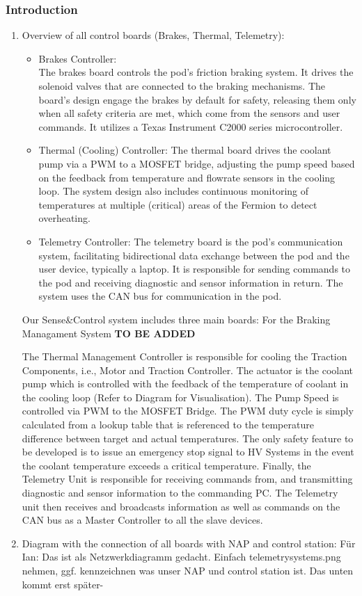 \subsubsection{Introduction}
\begin{enumerate}
    \item Overview of all control boards (Brakes, Thermal, Telemetry):
    \begin{itemize}
        \item Brakes Controller: \\
        The brakes board controls the pod's friction braking system.
        It drives the solenoid valves that are connected to the braking mechanisms.
        The board's design engage the brakes by default for safety, releasing them only when all safety criteria are met,
        which come from the sensors and user commands. 
        It utilizes a Texas Instrument C2000 series microcontroller.
        \item Thermal (Cooling) Controller: The thermal board drives the coolant pump via a PWM to a MOSFET bridge, adjusting the pump speed based on the feedback from temperature and flowrate sensors in the cooling loop.
        The system design also includes continuous monitoring of temperatures at multiple (critical) areas of the Fermion to detect overheating. 
        \item Telemetry Controller: The telemetry board is the pod's communication system, facilitating bidirectional data exchange between the pod and the user device, typically a laptop.
        It is responsible for sending commands to the pod and receiving diagnostic and sensor information in return.
        The system uses the CAN bus for communication in the pod.
    \end{itemize}
  
Our Sense\&Control system includes three main boards:
For the Braking Managament System \textbf{TO BE ADDED}

The Thermal Management Controller is responsible for cooling the Traction Components, i.e., Motor and Traction Controller. The actuator is the coolant pump which is controlled  with the feedback of the temperature of coolant in the cooling loop (Refer to Diagram for Visualisation).  The Pump Speed is controlled via PWM to the MOSFET Bridge. The PWM duty cycle is simply calculated from a lookup table that is referenced to the temperature difference between target and actual temperatures. The only safety feature to be developed is to issue an emergency stop signal to HV Systems in the event the coolant temperature exceeds a critical temperature.
Finally, the Telemetry Unit is responsible for receiving commands from, and transmitting diagnostic and sensor information to the commanding PC. The Telemetry unit then receives and broadcasts information as well as commands on the CAN bus as a Master Controller to all the slave devices. 
    \item Diagram with the connection of all boards with NAP and control station:
    Für Ian: Das ist als Netzwerkdiagramm gedacht. Einfach telemetrysystems.png nehmen, ggf. kennzeichnen was unser NAP und control station ist. Das unten kommt erst später-


\end{enumerate}
